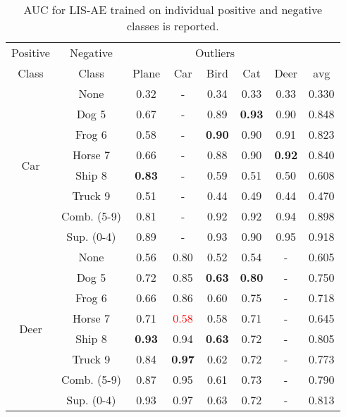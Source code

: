 \documentclass[acmtog, nonacm]{acmart}
\begin{document}
\begin{table}[]
\caption{AUC for LIS-AE trained on individual positive and negative classes is reported. }
\begin{tabular}{@{}c|c|ccccc|c@{}}
\midrule
Positive & Negative&\multicolumn{5}{c}{Outliers}& \\
\hspace{.25em}Class &\hspace{.25em}Class & Plane & Car  & Bird & Cat  & Deer & avg\\
\midrule
\multirow{8}{*}{Car}    & None                      & 0.32  & -    & 0.34 & 0.33 & 0.33 & 0.330                \\
                          & Dog 5                     & 0.67  & -    & 0.89 &\bf0.93 & 0.90 & 0.848                \\
                          & Frog 6                    & 0.58  & -    &\bf0.90 & 0.90 & 0.91 & 0.823                \\
                          & Horse 7                   & 0.66  & -    & 0.88 & 0.90 &\bf0.92 & 0.840                \\
                          & Ship 8                    &\bf0.83& -    & 0.59 & 0.51 & 0.50 & 0.608                \\
                          & Truck 9                   & 0.51  & -    & 0.44 & 0.49 & 0.44 & 0.470                \\
& Comb. (5-9)            & 0.81  & -    & 0.92 & 0.92 & 0.94 & 0.898                \\
                          & Sup. (0-4)          & 0.89  & -    & 0.93 & 0.90 & 0.95 & 0.918                \\
\midrule
\multirow{8}{*}{Deer}   & None                      & 0.56  & 0.80 & 0.52 & 0.54 & -    & 0.605                \\
                          & Dog  5                  & 0.72  & 0.85 & \bf0.63 & \bf0.80 & -    & 0.750                \\
                          & Frog  6                 & 0.66  & 0.86 & 0.60 & 0.75 & -    & 0.718                \\
                          & Horse 7                 & 0.71  & \textcolor{red}{0.58}& 0.58 & 0.71 & -    & 0.645                \\
                          & Ship   8                  &\bf0.93  & 0.94 & \bf0.63 & 0.72 & -    & 0.805                \\
                          & Truck 9                   & 0.84  &\bf0.97 & 0.62 & 0.72 & -    & 0.773                \\
                          & Comb. (5-9)            & 0.87  & 0.95 & 0.61 & 0.73 & -    & 0.790                \\
                          & Sup. (0-4)          & 0.93  & 0.97 & 0.63 & 0.72 & -    & 0.813            \\  
\midrule
\end{tabular}
\end{table}
\end{document}
